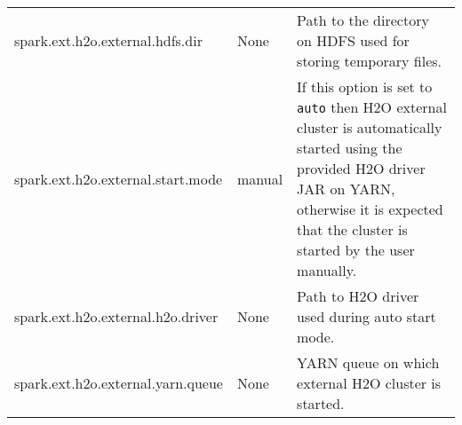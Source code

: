 \begin{footnotesize}
\begin{longtable}[!ht]{l l p{3.0cm}}
spark.ext.h2o.external.hdfs.dir & None & Path to the directory on HDFS used for storing temporary files. \\ \addlinespace

spark.ext.h2o.external.start.mode & manual & If this option is set to \texttt{auto} then H2O external cluster is automatically started using the provided H2O driver JAR on YARN, otherwise it is expected that the cluster is started by the user manually. \\ \addlinespace

spark.ext.h2o.external.h2o.driver & None & Path to H2O driver used during auto start mode. \\ \addlinespace

spark.ext.h2o.external.yarn.queue & None & YARN queue on which external H2O cluster is started.\\

\bottomrule
\end{longtable}
\end{footnotesize}



